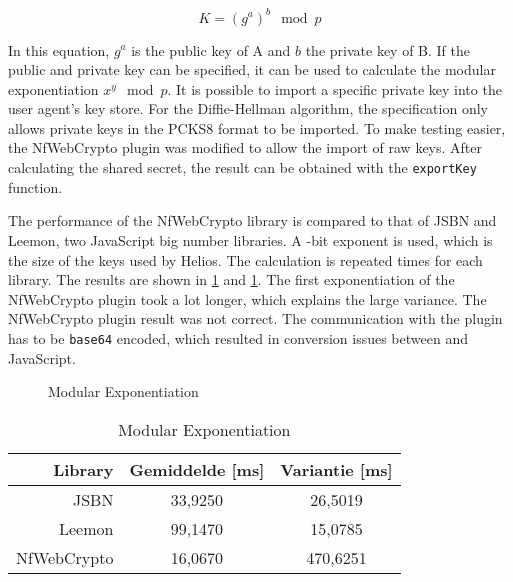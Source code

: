 \begin{equation}
  \label{eq:wc:diffie_hellman}
  K = (g^a)^b \mod{p}
\end{equation}

\par In this equation, $g^a$ is the public key of A and $b$ the private key of B. If the public and private key can be specified, it can be used to calculate the modular exponentiation $x^y \mod{p}$. It is possible to import a specific private key into the user agent's key store. For the Diffie-Hellman algorithm, the specification only allows private keys in the PCKS8 format to be imported. To make testing easier, the NfWebCrypto plugin was modified to allow the import of raw keys. After calculating the shared secret, the result can be obtained with the \texttt{exportKey} function.

\par The performance of the NfWebCrypto library is compared to that of JSBN and Leemon, two JavaScript big number libraries.\cite{site:wu_rsa_and_ecc_in_javascript}\cite{site:baird_big_integers_in_javascript} A -bit exponent is used, which is the size of the keys used by Helios. The calculation is repeated  times for each library. The results are shown in \ref{fig:wc:modular_exponentiation} and \ref{tab:wc:modular_exponentiation}. The first exponentiation of the NfWebCrypto plugin took a lot longer, which explains the large variance. The NfWebCrypto plugin result was not correct. The communication with the plugin has to be \texttt{base64} encoded, which resulted in conversion issues between \cplusplus and JavaScript.

\begin{figure}
  \caption{Modular Exponentiation}
  \label{fig:wc:modular_exponentiation}
\end{figure}

\begin{table}
  \begin{center}
    \begin{tabular}{r | c c}
      Library & Gemiddelde [ms] & Variantie [ms] \\ \hline
      JSBN & 33,9250 & 26,5019  \\
      Leemon & 99,1470 & 15,0785 \\
      NfWebCrypto & 16,0670 & 470,6251
    \end{tabular}
    \caption{Modular Exponentiation}
    \label{tab:wc:modular_exponentiation}
  \end{center}
\end{table}

